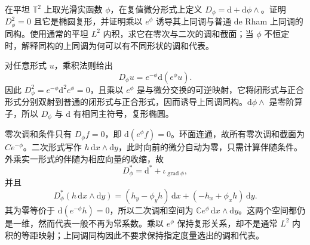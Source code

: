 \begin{exercise}\label{g3:ex:exact-one-form-twisted-complex}
	在平坦 \(\mathbb T^2\) 上取光滑实函数 \(\phi\)，在复值微分形式上定义 \(D_\phi=\mathrm d+\mathrm d\phi\wedge\)。证明 \(D_\phi^2=0\) 且它是椭圆复形，并证明乘以 \(e^\phi\) 诱导其上同调与普通 de Rham 上同调的同构。使用通常的平坦 \(L^2\) 内积，求它在零次与二次的调和截面；当 \(\phi\) 不恒定时，解释同构的上同调为何可以有不同形状的调和代表。
\end{exercise}
\begin{solution}
	对任意形式 \(u\)，乘积法则给出
	\[
		D_\phi u=e^{-\phi}\mathrm d(e^\phi u).
	\]
	因此 \(D_\phi^2=e^{-\phi}\mathrm d^2e^\phi=0\)，且乘以 \(e^\phi\) 是与微分交换的可逆映射，它将闭形式与正合形式分别双射到普通的闭形式与正合形式，因而诱导上同调同构。\(\mathrm d\phi\wedge\) 是零阶算子，所以 \(D_\phi\) 与 \(\mathrm d\) 有相同主符号，复形椭圆。

	零次调和条件只有 \(D_\phi f=0\)，即 \(\mathrm d(e^\phi f)=0\)。环面连通，故所有零次调和截面为 \(Ce^{-\phi}\)。二次形式写作 \(h\,\mathrm dx\wedge\mathrm dy\)，此时向前的微分自动为零，只需计算伴随条件。外乘实一形式的伴随为相应向量的收缩，故
	\[
		D_\phi^*=\mathrm d^*+\iota_{\operatorname{grad}\phi},
	\]
	并且
	\[
		D_\phi^*(h\,\mathrm dx\wedge\mathrm dy)
		=(h_y-\phi_yh)\,\mathrm dx+(-h_x+\phi_xh)\,\mathrm dy.
	\]
	其为零等价于 \(\mathrm d(e^{-\phi}h)=0\)，所以二次调和空间为 \(\mathbb C e^\phi\,\mathrm dx\wedge\mathrm dy\)。这两个空间都仍是一维，然而代表一般不再为常系数。乘以 \(e^\phi\) 保持复形关系，却不是通常 \(L^2\) 内积的等距映射；上同调同构因此不要求保持指定度量选出的调和代表。
\end{solution}

